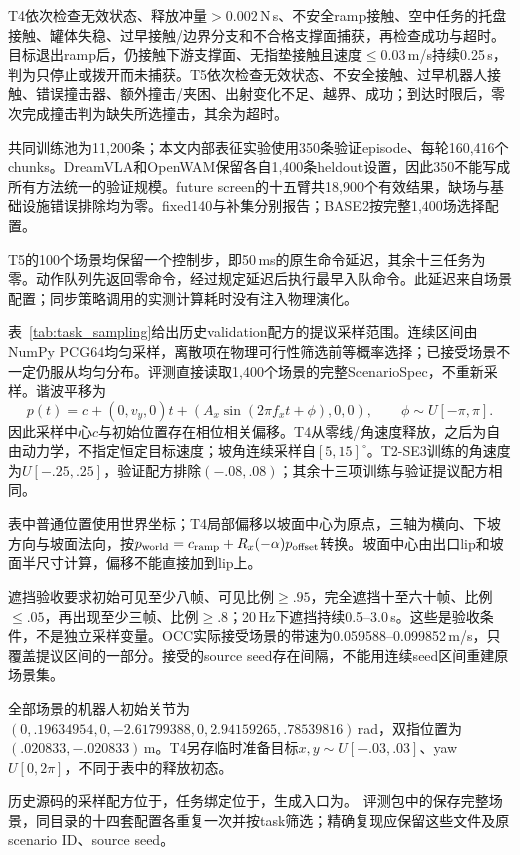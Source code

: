 T4依次检查无效状态、释放冲量$>0.002$\,N\,s、不安全ramp接触、空中任务的托盘接触、罐体失稳、过早接触/边界分支和不合格支撑面捕获，再检查成功与超时。目标退出ramp后，仍接触下游支撑面、无指垫接触且速度$\leq0.03$\,m/s持续0.25\,s，判为只停止或拨开而未捕获。T5依次检查无效状态、不安全接触、过早机器人接触、错误撞击器、额外撞击/夹困、出射变化不足、越界、成功；到达时限后，零次完成撞击判为缺失所选撞击，其余为超时。

共同训练池为11,200条；本文内部表征实验使用350条验证episode、每轮160,416个chunks。DreamVLA和OpenWAM保留各自1,400条heldout设置，因此350不能写成所有方法统一的验证规模。future screen的十五臂共18,900个有效结果，缺场与基础设施错误排除均为零。fixed140与补集分别报告；BASE2按完整1,400场选择配置。

T5的100个场景均保留一个控制步，即50\,ms的原生命令延迟，其余十三任务为零。动作队列先返回零命令，经过规定延迟后执行最早入队命令。此延迟来自场景配置；同步策略调用的实测计算耗时没有注入物理演化。


表~\ref{tab:task_sampling}给出历史validation配方的提议采样范围。连续区间由NumPy PCG64均匀采样，离散项在物理可行性筛选前等概率选择；已接受场景不一定仍服从均匀分布。评测直接读取1,400个场景的完整ScenarioSpec，不重新采样。谐波平移为
\[
p(t)=c+(0,v_y,0)t+(A_x\sin(2\pi f_xt+\phi),0,0),\qquad \phi\sim U[-\pi,\pi].
\]
因此采样中心$c$与初始位置存在相位相关偏移。T4从零线/角速度释放，之后为自由动力学，不指定恒定目标速度；坡角连续采样自$[5,15]^\circ$。T2-SE3训练的角速度为$U[-.25,.25]$，验证配方排除$(-.08,.08)$；其余十三项训练与验证提议配方相同。

表中普通位置使用世界坐标；T4局部偏移以坡面中心为原点，三轴为横向、下坡方向与坡面法向，按$p_{\rm world}=c_{\rm ramp}+R_x(-\alpha)p_{\rm offset}$转换。坡面中心由出口lip和坡面半尺寸计算，偏移不能直接加到lip上。

遮挡验收要求初始可见至少八帧、可见比例$\geq.95$，完全遮挡十至六十帧、比例$\leq.05$，再出现至少三帧、比例$\geq.8$；20\,Hz下遮挡持续0.5--3.0\,s。这些是验收条件，不是独立采样变量。OCC实际接受场景的带速为0.059588--0.099852\,m/s，只覆盖提议区间的一部分。接受的source seed存在间隔，不能用连续seed区间重建原场景集。

全部场景的机器人初始关节为$(0,.19634954,0,-2.61799388,0,2.94159265,.78539816)$\,rad，双指位置为$(.020833,-.020833)$\,m。T4另存临时准备目标$x,y\sim U[-.03,.03]$、yaw $U[0,2\pi]$，不同于表中的释放初态。

历史源码的采样配方位于，任务绑定位于，生成入口为。
评测包中的保存完整场景，同目录的十四套配置各重复一次并按task筛选；精确复现应保留这些文件及原scenario ID、source seed。

